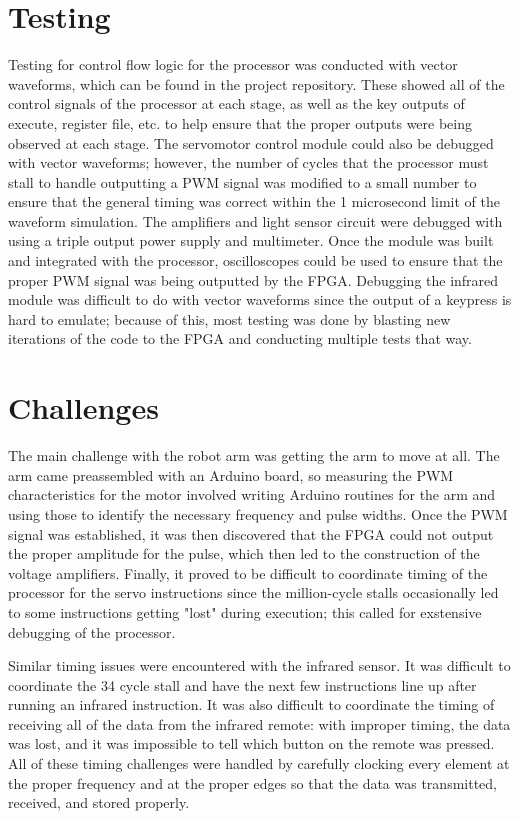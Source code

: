 \documentclass{article}
\begin{document}
\section{Testing}
    Testing for control flow logic for the processor was conducted with vector waveforms, which can be found in the project repository. These showed all of the control signals of the processor at each stage, as well as the key outputs of execute, register file, etc. to help ensure that the proper outputs were being observed at each stage. The servomotor control module could also be debugged with vector waveforms; however, the number of cycles that the processor must stall to handle outputting a PWM signal was modified to a small number to ensure that the general timing was correct within the 1 microsecond limit of the waveform simulation. The amplifiers and light sensor circuit were debugged with using a triple output power supply and multimeter. Once the module was built and integrated with the processor, oscilloscopes could be used to ensure that the proper PWM signal was being outputted by the FPGA. Debugging the infrared module was difficult to do with vector waveforms since the output of a keypress is hard to emulate; because of this, most testing was done by blasting new iterations of the code to the FPGA and conducting multiple tests that way.
    
\section{Challenges}
    The main challenge with the robot arm was getting the arm to move at all. The arm came preassembled with an Arduino board, so measuring the PWM characteristics for the motor involved writing Arduino routines for the arm and using those to identify the necessary frequency and pulse widths. Once the PWM signal was established, it was then discovered that the FPGA could not output the proper amplitude for the pulse, which then led to the construction of the voltage amplifiers. Finally, it proved to be difficult to coordinate timing of the processor for the servo instructions since the million-cycle stalls occasionally led to some instructions getting "lost" during execution; this called for exstensive debugging of the processor.

    Similar timing issues were encountered with the infrared sensor. It was difficult to coordinate the 34 cycle stall and have the next few instructions line up after running an infrared instruction. It was also difficult to coordinate the timing of receiving all of the data from the infrared remote: with improper timing, the data was lost, and it was impossible to tell which button on the remote was pressed. All of these timing challenges were handled by carefully clocking every element at the proper frequency and at the proper edges so that the data was transmitted, received, and stored properly.
\end{document}
